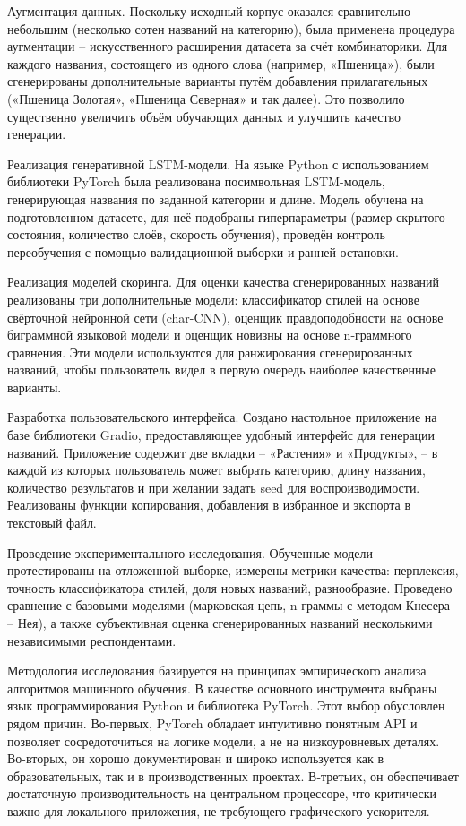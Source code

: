Аугментация данных. Поскольку исходный корпус оказался сравнительно небольшим (несколько сотен названий на категорию), была применена процедура аугментации -- искусственного расширения датасета за счёт комбинаторики. Для каждого названия, состоящего из одного слова (например, «Пшеница»), были сгенерированы дополнительные варианты путём добавления прилагательных («Пшеница Золотая», «Пшеница Северная» и так далее). Это позволило существенно увеличить объём обучающих данных и улучшить качество генерации.

Реализация генеративной LSTM-модели. На языке Python с использованием библиотеки PyTorch была реализована посимвольная LSTM-модель, генерирующая названия по заданной категории и длине. Модель обучена на подготовленном датасете, для неё подобраны гиперпараметры (размер скрытого состояния, количество слоёв, скорость обучения), проведён контроль переобучения с помощью валидационной выборки и ранней остановки.

Реализация моделей скоринга. Для оценки качества сгенерированных названий реализованы три дополнительные модели: классификатор стилей на основе свёрточной нейронной сети (char-CNN), оценщик правдоподобности на основе биграммной языковой модели и оценщик новизны на основе n-граммного сравнения. Эти модели используются для ранжирования сгенерированных названий, чтобы пользователь видел в первую очередь наиболее качественные варианты.

Разработка пользовательского интерфейса. Создано настольное приложение на базе библиотеки Gradio, предоставляющее удобный интерфейс для генерации названий. Приложение содержит две вкладки -- «Растения» и «Продукты», -- в каждой из которых пользователь может выбрать категорию, длину названия, количество результатов и при желании задать seed для воспроизводимости. Реализованы функции копирования, добавления в избранное и экспорта в текстовый файл.

Проведение экспериментального исследования. Обученные модели протестированы на отложенной выборке, измерены метрики качества: перплексия, точность классификатора стилей, доля новых названий, разнообразие. Проведено сравнение с базовыми моделями (марковская цепь, n-граммы с методом Кнесера -- Нея), а также субъективная оценка сгенерированных названий несколькими независимыми респондентами.

Методология исследования базируется на принципах эмпирического анализа алгоритмов машинного обучения. В качестве основного инструмента выбраны язык программирования Python и библиотека PyTorch. Этот выбор обусловлен рядом причин. Во-первых, PyTorch обладает интуитивно понятным API и позволяет сосредоточиться на логике модели, а не на низкоуровневых деталях. Во-вторых, он хорошо документирован и широко используется как в образовательных, так и в производственных проектах. В-третьих, он обеспечивает достаточную производительность на центральном процессоре, что критически важно для локального приложения, не требующего графического ускорителя.

